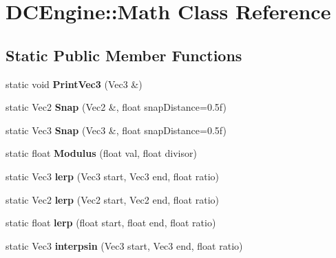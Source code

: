 \hypertarget{classDCEngine_1_1Math}{\section{D\-C\-Engine\-:\-:Math Class Reference}
\label{classDCEngine_1_1Math}
}
\subsection*{Static Public Member Functions}
\begin{DoxyCompactItemize}
\item 
\hypertarget{classDCEngine_1_1Math_a23127fb1e1ada222deb68bae8e019ccb}{static void {\bfseries Print\-Vec3} (Vec3 \&)}\label{classDCEngine_1_1Math_a23127fb1e1ada222deb68bae8e019ccb}

\item 
\hypertarget{classDCEngine_1_1Math_aa897c1f865917d3b84a0a81543c0e85a}{static Vec2 {\bfseries Snap} (Vec2 \&, float snap\-Distance=0.\-5f)}\label{classDCEngine_1_1Math_aa897c1f865917d3b84a0a81543c0e85a}

\item 
\hypertarget{classDCEngine_1_1Math_a37be1f95915c8a9d99a6d6e341e8d594}{static Vec3 {\bfseries Snap} (Vec3 \&, float snap\-Distance=0.\-5f)}\label{classDCEngine_1_1Math_a37be1f95915c8a9d99a6d6e341e8d594}

\item 
\hypertarget{classDCEngine_1_1Math_a82a5d410241e6b1d646df2abd0b4932e}{static float {\bfseries Modulus} (float val, float divisor)}\label{classDCEngine_1_1Math_a82a5d410241e6b1d646df2abd0b4932e}

\item 
\hypertarget{classDCEngine_1_1Math_a233810ce36b553ed35cfaa2e4f49eaa7}{static Vec3 {\bfseries lerp} (Vec3 start, Vec3 end, float ratio)}\label{classDCEngine_1_1Math_a233810ce36b553ed35cfaa2e4f49eaa7}

\item 
\hypertarget{classDCEngine_1_1Math_a78f0f271b48c2522780b5a992bacca69}{static Vec2 {\bfseries lerp} (Vec2 start, Vec2 end, float ratio)}\label{classDCEngine_1_1Math_a78f0f271b48c2522780b5a992bacca69}

\item 
\hypertarget{classDCEngine_1_1Math_a736e2914511e8c0a3e779e3d4699e7ab}{static float {\bfseries lerp} (float start, float end, float ratio)}\label{classDCEngine_1_1Math_a736e2914511e8c0a3e779e3d4699e7ab}

\item 
\hypertarget{classDCEngine_1_1Math_afe3a85fb543fde6b79f33d862bea26ee}{static Vec3 {\bfseries interpsin} (Vec3 start, Vec3 end, float ratio)}\label{classDCEngine_1_1Math_afe3a85fb543fde6b79f33d862bea26ee}


\end{DoxyCompactItemize}
